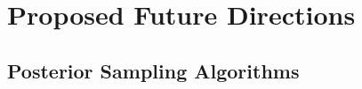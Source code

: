 \documentclass[9pt,handout]{beamer}
\begin{document}
%
%
%
%
%
%
%
%
%


\section{Proposed Future Directions}


\subsection{Posterior Sampling Algorithms}
\end{document}
